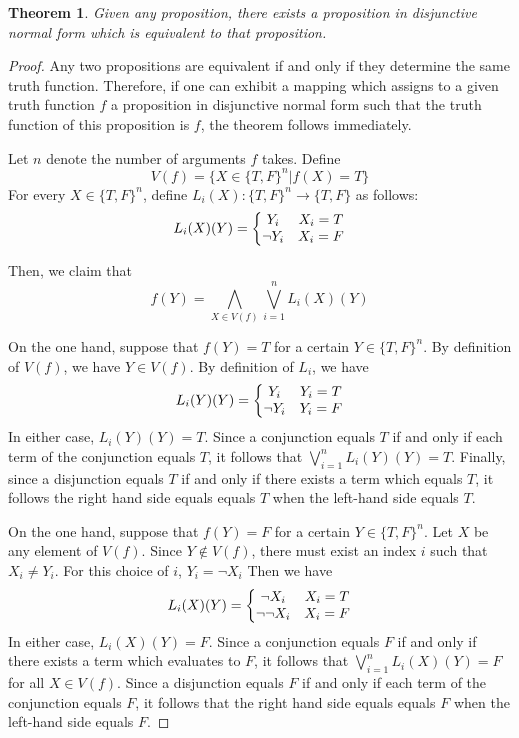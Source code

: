 \documentclass[12pt]{article}
\theoremstyle{theorem}
\newtheorem*{thm}{Theorem}
\begin{document}
\begin{thm}
Given any proposition, there exists a proposition in disjunctive normal form which is equivalent to that proposition.
\end{thm}

\begin{proof}
Any two propositions are equivalent if and only if they determine the same truth function.  Therefore, if one can exhibit a mapping which assigns to a given truth function $f$ a proposition in disjunctive normal form such that the truth function of this proposition is $f$, the theorem follows immediately.  

Let $n$ denote the number of arguments $f$ takes.  Define
\[ V(f) = \{ X \in \{T,F\}^n | f(X) = T \} \]
For every $X \in \{T,F\}^n$, define $L_i (X) \colon \{T,F\}^n \to  \{T,F\}$ as follows:
\[ L_i (X)(Y) = \left\{ \begin{matrix} Y_i & X_i = T \cr \neg Y_i & X_i = F \end{matrix} \right. \]

Then, we claim that
 \[ f(Y) = \bigwedge_{X \in V(f)} \bigvee_{i=1}^n L_i (X)(Y) \]

On the one hand, suppose that $f(Y) = T$ for a certain $Y \in \{T,F\}^n$. By definition of $V(f)$, we have $Y \in V(f)$.  By definition of $L_i$, we have 
 \[L_i (Y) (Y) = \left\{ \begin{matrix} Y_i & Y_i = T \cr \neg Y_i & Y_i = F \end{matrix} \right. \]
In either case, $L_i (Y) (Y) = T$.  Since a conjunction equals $T$ if and only if each term of the conjunction equals $T$, it follows that  $\bigvee_{i=1}^n L_i (Y) (Y) = T$.  Finally, since a disjunction equals $T$ if and only if there exists a term which equals $T$, it follows the right hand side equals equals $T$ when the left-hand side equals $T$.

On the one hand, suppose that $f(Y) = F$ for a certain $Y \in \{T,F\}^n$.  Let $X$ be any element of $V(f)$.  Since $Y \notin V(f)$, there must exist an index $i$ such that $X_i \neq Y_i$.  For this choice of $i$, $Y_i = \neg X_i$ Then we have
  \[L_i (X) (Y) = \left\{ \begin{matrix} \neg X_i & X_i = T \cr \neg \neg X_i & X_i = F \end{matrix} \right. \]
In either case, $L_i (X) (Y) = F$.  Since a conjunction equals $F$ if and only if there exists a term which evaluates to $F$, it follows that $\bigvee_{i=1}^n L_i (X) (Y) = F$ for all $X \in V(f)$.  Since a disjunction equals $F$ if and only if each term of the conjunction equals $F$, it follows that the right hand side equals equals $F$ when the left-hand side equals $F$.

\end{proof}
\end{document}
